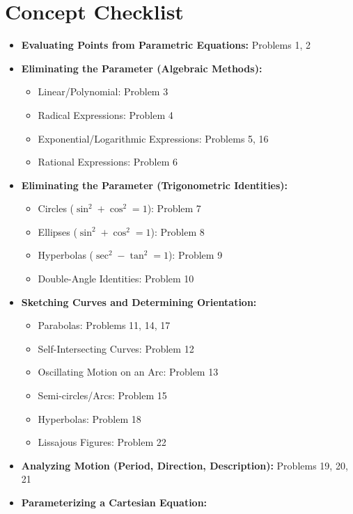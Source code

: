 \documentclass{article}
\begin{document}
\section*{Concept Checklist}
\begin{itemize}
    \item \textbf{Evaluating Points from Parametric Equations:} Problems 1, 2
    \item \textbf{Eliminating the Parameter (Algebraic Methods):}
        \begin{itemize}
            \item Linear/Polynomial: Problem 3
            \item Radical Expressions: Problem 4
            \item Exponential/Logarithmic Expressions: Problems 5, 16
            \item Rational Expressions: Problem 6
        \end{itemize}
    \item \textbf{Eliminating the Parameter (Trigonometric Identities):}
        \begin{itemize}
            \item Circles ($\sin^2+\cos^2=1$): Problem 7
            \item Ellipses ($\sin^2+\cos^2=1$): Problem 8
            \item Hyperbolas ($\sec^2-\tan^2=1$): Problem 9
            \item Double-Angle Identities: Problem 10
        \end{itemize}
    \item \textbf{Sketching Curves and Determining Orientation:}
        \begin{itemize}
            \item Parabolas: Problems 11, 14, 17
            \item Self-Intersecting Curves: Problem 12
            \item Oscillating Motion on an Arc: Problem 13
            \item Semi-circles/Arcs: Problem 15
            \item Hyperbolas: Problem 18
            \item Lissajous Figures: Problem 22
        \end{itemize}
    \item \textbf{Analyzing Motion (Period, Direction, Description):} Problems 19, 20, 21
    \item \textbf{Parameterizing a Cartesian Equation:}
        \begin{itemize}

\end{itemize}
\end{itemize}
\end{document}
